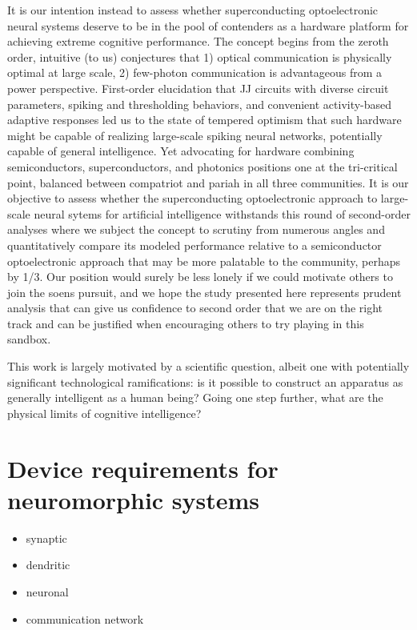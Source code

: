 \documentclass[twocolumn]{article}
\begin{document}
It is our intention instead to assess whether superconducting optoelectronic neural systems deserve to be in the pool of contenders as a hardware platform for achieving extreme cognitive performance. The concept begins from the zeroth order, intuitive (to us) conjectures that 1) optical communication is physically optimal at large scale, 2) few-photon communication is advantageous from a power perspective. First-order elucidation that JJ circuits with diverse circuit parameters, spiking and thresholding behaviors, and convenient activity-based adaptive responses led us to the state of tempered optimism that such hardware might be capable of realizing large-scale spiking neural networks, potentially capable of general intelligence. Yet advocating for hardware combining semiconductors, superconductors, and photonics positions one at the tri-critical point, balanced between compatriot and pariah in all three communities. It is our objective to assess whether the superconducting optoelectronic approach to large-scale neural sytems for artificial intelligence withstands this round of second-order analyses where we subject the concept to scrutiny from numerous angles and quantitatively compare its modeled performance relative to a semiconductor optoelectronic approach that may be more palatable to the community, perhaps by 1/3. Our position would surely be less lonely if we could motivate others to join the soens pursuit, and we hope the study presented here represents prudent analysis that can give us confidence to second order that we are on the right track and can be justified when encouraging others to try playing in this sandbox.

This work is largely motivated by a scientific question, albeit one with potentially significant technological ramifications: is it possible to construct an apparatus as generally intelligent as a human being? Going one step further, what are the physical limits of cognitive intelligence?

\section{\label{sec:neural_device_requirements}Device requirements for neuromorphic systems}
\begin{itemize}
\item synaptic
\item dendritic
\item neuronal
\item communication network
\end{itemize}
	
\end{document}

